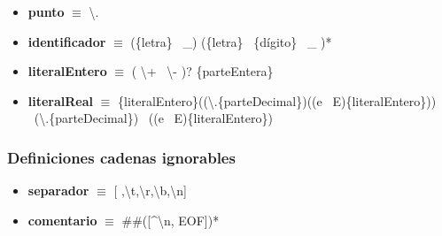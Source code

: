 \documentclass[11pt]{article}
\begin{document}
\begin{itemize}
            \item \textbf{punto }$\equiv$ \textbackslash.
            \item \textbf{identificador }$\equiv$ (\{letra\} \textbar\ \_) (\{letra\} \textbar\ \{dígito\} \textbar\ \_ )*
            \item \textbf{literalEntero }$\equiv$ ( \textbackslash + \textbar\ \textbackslash - )? \{parteEntera\}
            \item \textbf{literalReal }  $\equiv$ \{literalEntero\}((\textbackslash.\{parteDecimal\})((e \textbar\ E)\{literalEntero\})) \textbar\ (\textbackslash.\{parteDecimal\}) \textbar\ ((e \textbar\ E)\{literalEntero\})
        \end{itemize}
        \subsubsection*{Definiciones cadenas ignorables}
        \begin{itemize}
            \item \textbf{separador }$\equiv$ [ ,\textbackslash t,\textbackslash r,\textbackslash b,\textbackslash n]
            \item \textbf{comentario }$\equiv$ \#\#([\^{}\textbackslash n, EOF])*
        \end{itemize}
\end{document}
